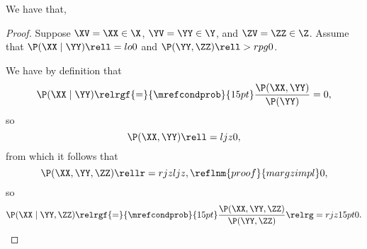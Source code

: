 \begin{proposition}
  We have that, %
\end{proposition}

\begin{proof}
  Suppose 
  $\XV = \XX \in \X$,
  $\YV = \YY \in \Y$, and
  $\ZV = \ZZ \in \Z$. Assume that $\P(\XX \mid \YY) \rell = lo 0$ and $\P(\YY, \ZZ) \rell > rpg 0$.

  We have by definition that
  $$\P(\XX \mid \YY) \relrgf{=}{\mrefcondprob}{15pt} \frac{\P(\XX, \YY)}{\P(\YY)} = 0,$$
  so
  $$\P(\XX, \YY) \rell = ljz 0,$$
  from which it follows that
  $$\P(\XX, \YY, \ZZ) \rellr = rjz ljz,\reflnm{proof}{margzimpl} 0,$$
  so
  $$\P(\XX \mid \YY, \ZZ) \relrgf{=}{\mrefcondprob}{15pt} \frac{\P(\XX, \YY, \ZZ)}{\P(\YY, \ZZ)}
  \relrg = rjz 15pt 0.$$%
\end{proof}
